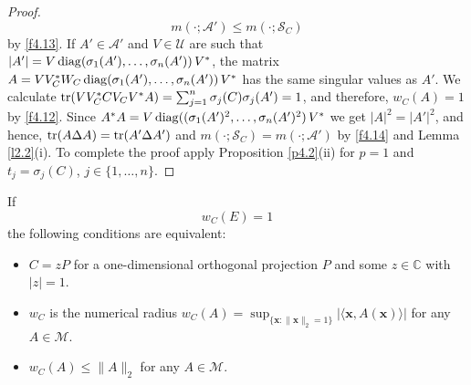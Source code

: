\documentclass{amsart}
\begin{document}
\begin{proof}
\begin{equation} \label{f4.14}
             m( \cdot ; {\mathcal A}') \leq m( \cdot ; {\mathcal S}_C)
\end{equation}
by \eqref{f4.13}. If $A' \in {\mathcal A}'$ and $V \in \mathcal U$ are such that $|A'| = V \, {\rm diag}(\sigma_1(A'), \ldots , \sigma_n(A')) \, V^*$, the matrix $A= VV_C^*W_C \, {\rm diag}(\sigma_1(A'), \ldots , \sigma_n(A')) \, V^*$ has the same singular values as $A'$. We calculate ${\rm tr}(VV_C^*CV_CV^* A) =     \sum_{j=1}^n \sigma_j(C) \sigma_j(A') = 1$, and therefore, $w_C(A) = 1$ by \eqref{f4.12}. Since $A^*A=V \, {\rm diag}((\sigma_1(A')^2, \ldots, \sigma_n(A')^2) \, V^*$ we get $|A|^2 = |A'|^2$, and hence, ${\rm tr}(A \Delta A) = {\rm tr} (A' \Delta A')$ and $m( \cdot ; {\mathcal S}_C) = m( \cdot ; {\mathcal A}')$ by \eqref{f4.14} and Lemma \ref{l2.2}(i). To complete the proof apply Proposition \ref{p4.2}(ii) for $p=1$ and $t_j = \sigma_j(C)$, $j \in \{1,\ldots,n\}$.
\end{proof}

\begin{cor} \label{c4.7}
   If
   \begin{equation} \label{f4.15}
       w_C(E)=1 
   \end{equation}
   the following conditions are equivalent:
   \begin{itemize}
   \item[(i)] $C = z P$ for a one-dimensional orthogonal projection $P$ and some $z \in \mathbb C$ with $|z|=1$.
   \item[(ii)] $w_C$ is the numerical radius $w_C(A) = \sup_{\{ {\mathbf x} : \|{\mathbf x}\|_2=1 \} } | \langle {\mathbf x}, A ({\mathbf x}) \rangle |$ for any $A \in \mathcal M$.
   \item[(iii)] $w_C(A) \leq \|A\|_2$ for any $A \in \mathcal M$.
   \end{itemize}
\end{cor}
\end{document}
